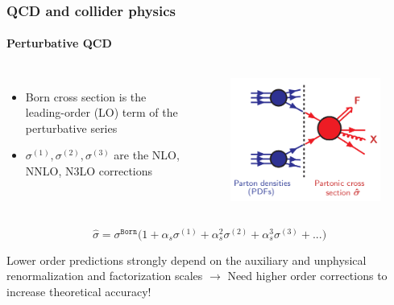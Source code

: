 \documentclass[aspectratio=43]{beamer}
\begin{document}
\begin{frame}
	
	\frametitle{QCD and collider physics}
	\framesubtitle{Perturbative QCD}
	
	\begin{columns}
	
	
	\begin{itemize}
		\item Born cross section is the leading-order (LO) term of the perturbative series
		\item $\sigma^{(1)}, \sigma^{(2)}, \sigma^{(3)}$ are the NLO, NNLO, N3LO corrections
	\end{itemize}
	
	\begin{figure}[!htb]
		\includegraphics[width = 5 cm]{plots/part1/factorization_3.png}
	\end{figure}
	
	\end{columns}
	
	\begin{equation}
		\hat{\sigma} = \sigma^{\texttt{Born}} \Big( 1 +
		\alpha_{s} \sigma^{(1)} + 
		\alpha_{s}^{2} \sigma^{(2)} + 
		\alpha_{s}^{3} \sigma^{(3)} + ... \Big) \nonumber
	\end{equation}
	
	Lower order predictions strongly depend on the auxiliary and unphysical renormalization and factorization scales $\longrightarrow$ {\color{red}Need higher order corrections to increase theoretical accuracy!}

\end{frame}
\end{document}
